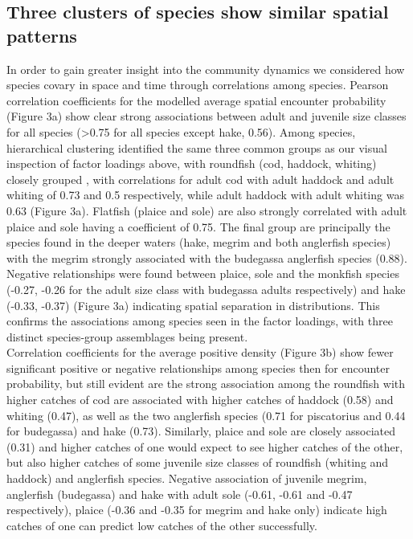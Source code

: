 \documentclass[fleqn,10pt]{wlscirep}
\begin{document}
\begin{linenumbers}
\subsection*{Three clusters of species show similar spatial patterns\\} In
order to gain greater insight into the community dynamics we considered how
species covary in space and time through correlations among species.  Pearson
correlation coefficients for the modelled average spatial encounter probability
(Figure 3a) show clear strong associations between adult and juvenile size
classes for all species (\textgreater 0.75 for all species except hake, 0.56).
Among species, hierarchical clustering identified the same three common
groups as our visual inspection of factor loadings
above, with roundfish (cod, haddock, whiting) closely grouped
, with correlations for adult cod with
adult haddock and adult whiting of 0.73 and 0.5 respectively, while adult
haddock with adult whiting was 0.63 (Figure 3a). Flatfish (plaice and sole) are
also strongly correlated with adult plaice and sole having a coefficient of
0.75.  The final group are principally the species found in the deeper waters
(hake, megrim and both anglerfish species) with the megrim strongly associated
with the budegassa anglerfish species (0.88). Negative relationships were found
between plaice, sole and the monkfish species (-0.27, -0.26 for the adult size
class with budegassa adults respectively) and hake (-0.33, -0.37) (Figure 3a)
indicating spatial separation in distributions. This confirms the associations
among species seen in the factor loadings, with three distinct species-group
assemblages being present.\\

Correlation coefficients for the average positive density (Figure 3b) show
fewer significant positive or negative relationships among species then
for encounter probability, but still evident are the strong association among
the roundfish with higher catches of cod are associated with higher catches of
haddock (0.58) and whiting (0.47), as well as the two anglerfish species (0.71
for piscatorius and 0.44 for budegassa) and hake (0.73). Similarly, plaice and
sole are closely associated (0.31) and higher catches of one would expect to
see higher catches of the other, but also higher catches of some juvenile size
classes of roundfish (whiting and haddock) and anglerfish species. Negative
association of juvenile megrim, anglerfish (budegassa) and hake with adult sole
(-0.61, -0.61 and -0.47 respectively), plaice (-0.36 and -0.35 for megrim and
hake only) indicate high catches of one can predict low catches of the other
successfully.\\


\end{linenumbers}
\end{document}
